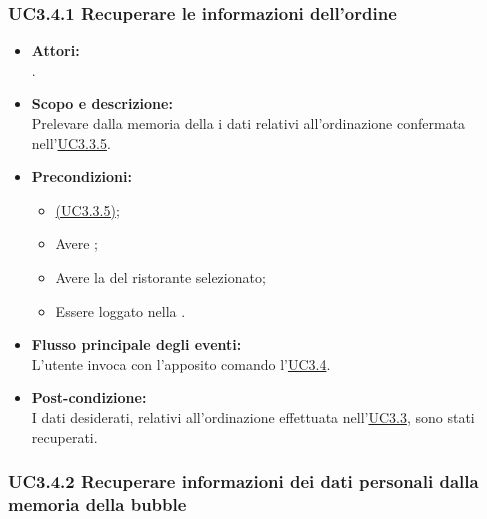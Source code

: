 \subsubsection{UC3.4.1 Recuperare le informazioni dell'ordine} \label{UC3.4.1}

\begin{itemize}
	\item \textbf{Attori:}
	\\.
	\item \textbf{Scopo e descrizione:} 
	\\Prelevare dalla memoria della  i dati relativi all'ordinazione confermata nell’\hyperref[UC3.3.5]{UC3.3.5}.
	\item \textbf{Precondizioni:}
	\begin{itemize}
		\item \hyperref[UC3.3.5]{(UC3.3.5)};
		\item Avere ;
		\item Avere la  del ristorante selezionato;
		\item Essere loggato nella .
	\end{itemize}
	\item \textbf{Flusso principale degli eventi:}
	\\L'utente invoca con l'apposito comando l’\hyperref[UC3.4]{UC3.4}.
	\item \textbf{Post-condizione:}
	\\I dati desiderati, relativi all'ordinazione effettuata nell’\hyperref[UC3.3]{UC3.3}, sono stati recuperati. 
\end{itemize}

\subsubsection{UC3.4.2 Recuperare informazioni dei dati personali dalla memoria della bubble} \label{UC3.4.2}

